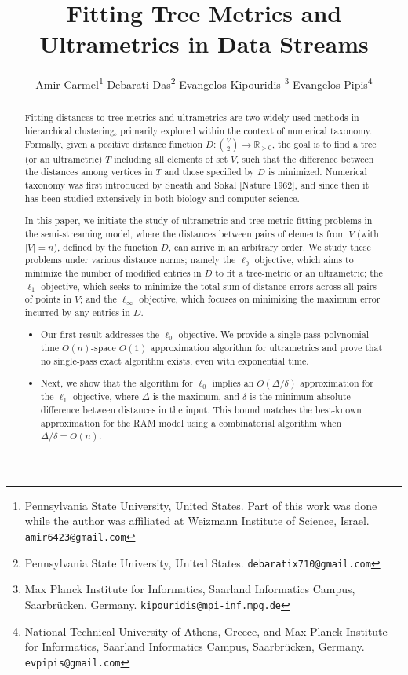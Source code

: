 \documentclass{article}
\date{}
\title{\Large Fitting Tree Metrics and Ultrametrics in Data Streams}
\author{
Amir Carmel\thanks{Pennsylvania State University, United States. Part of this work was done while the author was affiliated at Weizmann Institute of Science, Israel. \texttt{amir6423@gmail.com}}
\qquad
Debarati Das\thanks{Pennsylvania State University, United States. \texttt{debaratix710@gmail.com}} 
\qquad
Evangelos Kipouridis \thanks{Max Planck Institute for Informatics, Saarland Informatics Campus, Saarbr{\"u}cken, Germany. \texttt{kipouridis@mpi-inf.mpg.de}}
\qquad
Evangelos Pipis\thanks{National Technical University of Athens, Greece, and Max Planck Institute for Informatics, Saarland Informatics Campus, Saarbr{\"u}cken, Germany. \texttt{evpipis@gmail.com}}
}
\begin{document}
\maketitle

\renewcommand{\thefootnote}{}
\renewcommand{\thefootnote}{\arabic{footnote}}


\vspace{-1cm}

\begin{abstract}

    Fitting distances to tree metrics and ultrametrics are two widely used methods in hierarchical clustering, primarily explored within the context of numerical taxonomy. Formally, given a positive distance function $ D: \binom{V}{2} \rightarrow \mathbb{R}_{>0} $, the goal is to find a tree (or an ultrametric) $ T $ including all elements of set $ V $, such that the difference between the distances among vertices in $ T $ and those specified by $ D $ is minimized. Numerical taxonomy was first introduced by Sneath and Sokal [Nature 1962], and since then it has been studied extensively in both biology and computer science.

    In this paper, we initiate the study of ultrametric and tree metric fitting problems in the semi-streaming model, where the distances between pairs of elements from $ V $ (with $|V|=n$), defined by the function $ D $, can arrive in an arbitrary order. We study these problems under various distance norms; namely the $\ell_0$ objective, which aims to minimize the number of modified entries in $ D $ to fit a tree-metric or an ultrametric; the $\ell_1$ objective, which seeks to minimize the total sum of distance errors across all pairs of points in $ V $; and the $\ell_\infty$ objective, which focuses on minimizing the maximum error incurred by any entries in $ D $.

\begin{itemize}
    \item Our first result addresses the $\ell_0$ objective. We provide a single-pass polynomial-time $\tilde{O}(n)$-space $O(1)$ approximation algorithm for ultrametrics and prove that no single-pass exact algorithm exists, even with exponential time.
    
    \item Next, we show that the algorithm for $\ell_0$ implies an $O(\Delta/\delta)$ approximation for the $\ell_1$ objective, where $\Delta$ is the maximum, and $\delta$ is the minimum absolute difference between distances in the input. This bound matches the best-known approximation for the RAM model using a combinatorial algorithm when $\Delta/\delta = O(n)$.
    

\end{itemize}
\end{abstract}
\end{document}
